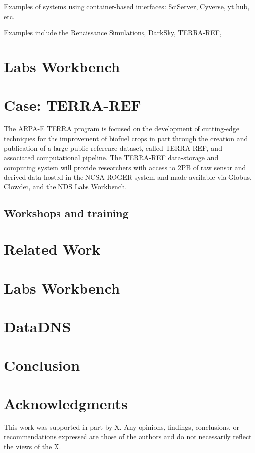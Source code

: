 \documentclass{sig-alternate}
\begin{document}
Examples of systems using container-based interfaces: SciServer, Cyverse, yt.hub, etc.

Examples include the Renaissance Simulations, DarkSky, TERRA-REF,

\section{Labs Workbench}

\section{Case: TERRA-REF}

The ARPA-E TERRA program is focused on the development of cutting-edge techniques for the improvement of biofuel crops in part through the creation and publication of a large public reference dataset, called TERRA-REF, and associated computational pipeline. The TERRA-REF data-storage and computing system will provide researchers with access to 2PB of raw sensor and derived data hosted in the NCSA ROGER system and made available via Globus, Clowder, and the NDS Labs Workbench.  


\subsection{Workshops and training}


\section{Related Work}

\section{Labs Workbench}

\section{DataDNS}

\section{Conclusion}




\section{Acknowledgments}
This work was supported in part by X. Any opinions, findings, conclusions, or recommendations expressed are those of the authors and do not necessarily reflect the views of the X.


  
\end{document}
